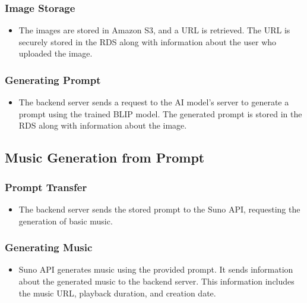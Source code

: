 \documentclass[conference]{IEEEtran}
\begin{document}
\subsubsection{Image Storage}
\begin{itemize}
    \item The images are stored in Amazon S3, and a URL is retrieved. The URL is securely stored in the RDS along with information about the user who uploaded the image.\\
\end{itemize}

\subsubsection{Generating Prompt}
\begin{itemize}
    \item The backend server sends a request to the AI model's server to generate a prompt using the trained BLIP model. The generated prompt is stored in the RDS along with information about the image.\\
\end{itemize}


\subsection{Music Generation from Prompt}

\subsubsection{Prompt Transfer}
\begin{itemize}
    \item The backend server sends the stored prompt to the Suno API, requesting the generation of basic music.\\
\end{itemize}

\subsubsection{Generating Music}
\begin{itemize}
    \item Suno API generates music using the provided prompt. It sends information about the generated music to the backend server. This information includes the music URL, playback duration, and creation date.\\
\end{itemize}
\end{document}
